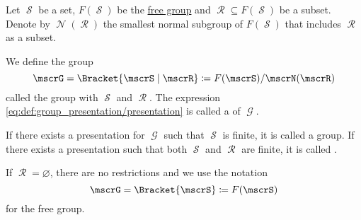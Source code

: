 \begin{definition}\label{def:group_presentation}
  Let \( \mscrS \) be a set, \( F(\mscrS) \) be the \hyperref[def:free_group]{free group} and \( \mscrR \subseteq F(\mscrS) \) be a subset. Denote by \( \mscrN(\mscrR) \) the smallest normal subgroup of \( F(\mscrS) \) that includes \( \mscrR \) as a subset.

  We define the group
  \begin{equation}\label{eq:def:group_presentation/presentation}
    \mscrG = \Bracket{ \mscrS \mid \mscrR} \coloneqq F(\mscrS) / \mscrN(\mscrR)
  \end{equation}
  called the group with  \( \mscrS \) and  \( \mscrR \). The expression \eqref{eq:def:group_presentation/presentation} is called a  of \( \mscrG \).

  If there exists a presentation for \( \mscrG \) such that \( \mscrS \) is finite, it is called a  group. If there exists a presentation such that both \( \mscrS \) and \( \mscrR \) are finite, it is called .

  If \( \mscrR = \varnothing \), there are no restrictions and we use the notation
  \begin{equation}\label{eq:def:group_presentation/free}
    \mscrG = \Bracket{ \mscrS } \coloneqq F(\mscrS)
  \end{equation}
  for the free group.
\end{definition}

